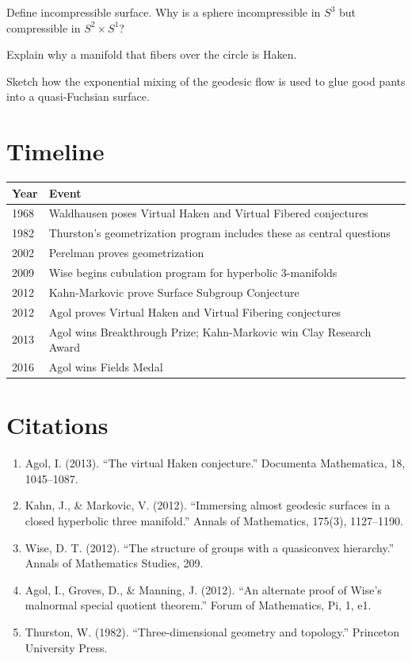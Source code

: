\begin{exercise}[Basic]
Define incompressible surface. Why is a sphere incompressible in $S^3$ but compressible in $S^2 \times S^1$?
\end{exercise}

\begin{exercise}[Intermediate]
Explain why a manifold that fibers over the circle is Haken.
\end{exercise}

\begin{exercise}[Advanced]
Sketch how the exponential mixing of the geodesic flow is used to glue good pants into a quasi-Fuchsian surface.
\end{exercise}

\section{Timeline}

\begin{tabularx}{\linewidth}{lX}
\toprule
\textbf{Year} & \textbf{Event} \\ \midrule
1968 & Waldhausen poses Virtual Haken and Virtual Fibered conjectures \\ 
1982 & Thurston's geometrization program includes these as central questions \\ 
2002 & Perelman proves geometrization \\ 
2009 & Wise begins cubulation program for hyperbolic 3-manifolds \\ 
2012 & Kahn-Markovic prove Surface Subgroup Conjecture \\ 
2012 & Agol proves Virtual Haken and Virtual Fibering conjectures \\ 
2013 & Agol wins Breakthrough Prize; Kahn-Markovic win Clay Research Award \\ 
2016 & Agol wins Fields Medal \\ \bottomrule
\end{tabularx}

\section{Citations}

\begin{enumerate}
\item Agol, I. (2013). ``The virtual Haken conjecture.'' Documenta Mathematica, 18, 1045--1087.
\item Kahn, J., \& Markovic, V. (2012). ``Immersing almost geodesic surfaces in a closed hyperbolic three manifold.'' Annals of Mathematics, 175(3), 1127--1190.
\item Wise, D. T. (2012). ``The structure of groups with a quasiconvex hierarchy.'' Annals of Mathematics Studies, 209.
\item Agol, I., Groves, D., \& Manning, J. (2012). ``An alternate proof of Wise's malnormal special quotient theorem.'' Forum of Mathematics, Pi, 1, e1.
\item Thurston, W. (1982). ``Three-dimensional geometry and topology.'' Princeton University Press.
\end{enumerate}
